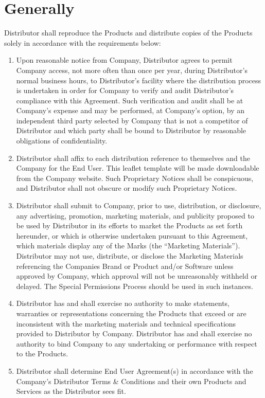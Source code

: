 \documentclass[letterpaper,10pt,english]{sphinxmanual}
\begin{document}
\section{Generally}
\label{\detokenize{distributionandpackaging:generally}}
Distributor shall reproduce the Products and distribute copies of the Products solely in accordance with the requirements below:
\begin{enumerate}
\item {} 
Upon reasonable notice from Company, Distributor agrees to permit Company access, not more often than once per year, during Distributor’s normal business hours, to Distributor’s facility where the distribution process is undertaken in order for Company to verify and audit Distributor’s compliance with this Agreement. Such verification and audit shall be at Company’s expense and may be performed, at Company’s option, by an independent third party selected by Company that is not a competitor of Distributor and which party shall be bound to Distributor by reasonable obligations of confidentiality.

\item {} 
Distributor shall affix to each distribution reference to themselves and the Company for the End User. This leaflet template will be made downloadable from the Company website. Such Proprietary Notices shall be conspicuous, and Distributor shall not obscure or modify such Proprietary Notices.

\item {} 
Distributor shall submit to Company, prior to use, distribution, or disclosure, any advertising, promotion, marketing materials, and publicity proposed to be used by Distributor in its efforts to market the Products as set forth hereunder, or which is otherwise undertaken pursuant to this Agreement, which materials display any of the Marks (the “Marketing Materials”). Distributor may not use, distribute, or disclose the Marketing Materials referencing the Companies Brand or Product and/or Software unless approved by Company, which approval will not be unreasonably withheld or delayed. The Special Permissions Process should be used in such instances.

\item {} 
Distributor has and shall exercise no authority to make statements, warranties or representations concerning the Products that exceed or are inconsistent with the marketing materials and technical specifications provided to Distributor by Company.  Distributor has and shall exercise no authority to bind Company to any undertaking or performance with respect to the Products.

\item {} 
Distributor shall determine End User Agreement(s) in accordance with the Company’s Distributor Terms \& Conditions and their own Products and Services as the Distributor sees fit.

\end{enumerate}
\end{document}

